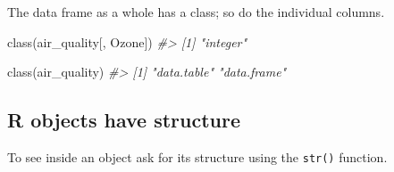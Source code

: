 \documentclass[
]{book}
\newenvironment{Shaded}{\begin{snugshade}}{\end{snugshade}}
\newcommand{\CommentTok}[1]{\textcolor[rgb]{0.56,0.35,0.01}{\textit{#1}}}
\newcommand{\FunctionTok}[1]{\textcolor[rgb]{0.00,0.00,0.00}{#1}}
\newcommand{\NormalTok}[1]{#1}
\begin{document}
The data frame as a whole has a class; so do the individual columns.

\begin{Shaded}
\begin{Highlighting}[]
\FunctionTok{class}\NormalTok{(air\_quality[, Ozone])}
\CommentTok{\#\textgreater{} [1] "integer"}

\FunctionTok{class}\NormalTok{(air\_quality)}
\CommentTok{\#\textgreater{} [1] "data.table" "data.frame"}
\end{Highlighting}
\end{Shaded}

\hypertarget{r-objects-have-structure}{%
\subsection{R objects have structure}\label{r-objects-have-structure}}

To see inside an object ask for its structure using the \texttt{str()} function.
\end{document}
